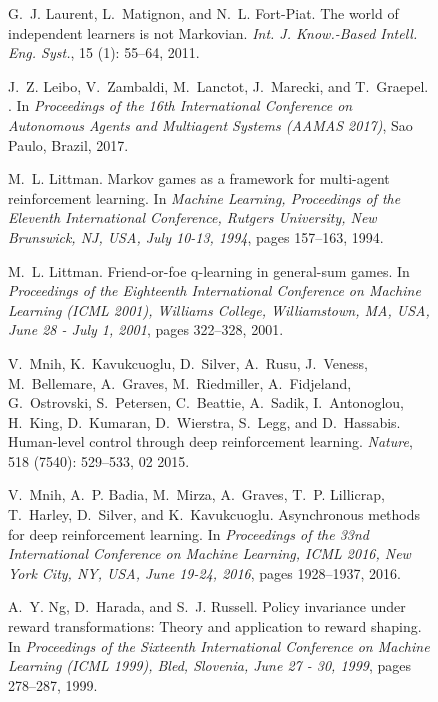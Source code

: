 \documentclass{article}
\begin{document}
\begin{SCfigure}
\begin{thebibliography}{40}
G.~J. Laurent, L.~Matignon, and N.~L. Fort-Piat.
\newblock The world of independent learners is not {M}arkovian.
\newblock \emph{Int. J. Know.-Based Intell. Eng. Syst.}, 15
  (1): 55--64, 2011.

J.~Z. Leibo, V.~Zambaldi, M.~Lanctot, J.~Marecki, and T.~Graepel.
.
\newblock In \emph{Proceedings of the 16th International Conference on
  Autonomous Agents and Multiagent Systems (AAMAS 2017)}, Sao Paulo, Brazil,
  2017.

M.~L. Littman.
\newblock Markov games as a framework for multi-agent reinforcement learning.
\newblock In \emph{Machine Learning, Proceedings of the Eleventh International
  Conference, Rutgers University, New Brunswick, NJ, USA, July 10-13, 1994},
  pages 157--163, 1994.

M.~L. Littman.
\newblock Friend-or-foe q-learning in general-sum games.
\newblock In \emph{Proceedings of the Eighteenth International Conference on
  Machine Learning {(ICML} 2001), Williams College, Williamstown, MA, USA, June
  28 - July 1, 2001}, pages 322--328, 2001.

V.~Mnih, K.~Kavukcuoglu, D.~Silver, A.~Rusu, J.~Veness, M.~Bellemare,
  A.~Graves, M.~Riedmiller, A.~Fidjeland, G.~Ostrovski, S.~Petersen,
  C.~Beattie, A.~Sadik, I.~Antonoglou, H.~King, D.~Kumaran, D.~Wierstra,
  S.~Legg, and D.~Hassabis.
\newblock Human-level control through deep reinforcement learning.
\newblock \emph{Nature}, 518 (7540): 529--533, 02 2015.

V.~Mnih, A.~P. Badia, M.~Mirza, A.~Graves, T.~P. Lillicrap, T.~Harley,
  D.~Silver, and K.~Kavukcuoglu.
\newblock Asynchronous methods for deep reinforcement learning.
\newblock In \emph{Proceedings of the 33nd International Conference on Machine
  Learning, {ICML} 2016, New York City, NY, USA, June 19-24, 2016}, pages
  1928--1937, 2016.

A.~Y. Ng, D.~Harada, and S.~J. Russell.
\newblock Policy invariance under reward transformations: Theory and
  application to reward shaping.
\newblock In \emph{Proceedings of the Sixteenth International Conference on
  Machine Learning {(ICML} 1999), Bled, Slovenia, June 27 - 30, 1999}, pages
  278--287, 1999.


\end{thebibliography}
\end{SCfigure}
\end{document}
